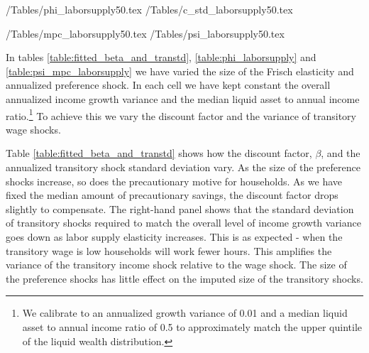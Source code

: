\documentclass[titlepage]{\econtex}\newcommand{\texname}{ConsumptionHeterogeneity}
\begin{document}
\begin{center}
	\econtexRoot/Tables/phi_laborsupply50.tex	
	\econtexRoot/Tables/c_std_laborsupply50.tex		
	\label{table:phi_laborsupply}
\end{center}

\begin{center}
	\econtexRoot/Tables/mpc_laborsupply50.tex
	\econtexRoot/Tables/psi_laborsupply50.tex		
	\label{table:psi_mpc_laborsupply}
\end{center}

In tables \ref{table:fitted_beta_and_transtd}, \ref{table:phi_laborsupply} and \ref{table:psi_mpc_laborsupply} we have varied the size of the Frisch elasticity and annualized preference shock. In each cell we have kept constant the overall annualized income growth variance and the median liquid asset to annual income ratio.\footnote{We calibrate to an annualized growth variance of 0.01 and a median liquid asset to annual income ratio of 0.5 to approximately match the upper quintile of the liquid wealth distribution.} To achieve this we vary the discount factor and the variance of transitory wage shocks.

Table \ref{table:fitted_beta_and_transtd} shows how the discount factor, $\beta$, and the annualized transitory shock standard deviation vary. As the size of the preference shocks increase, so does the precautionary motive for households. As we have fixed the median amount of precautionary savings, the discount factor drops slightly to compensate. The right-hand panel shows that the standard deviation of transitory shocks required to match the overall level of income growth variance goes down as labor supply elasticity increases. This is as expected - when the transitory wage is low households will work fewer hours. This amplifies the variance of the transitory income shock relative to the wage shock. The size of the preference shocks has little effect on the imputed size of the transitory shocks.
\end{document}
